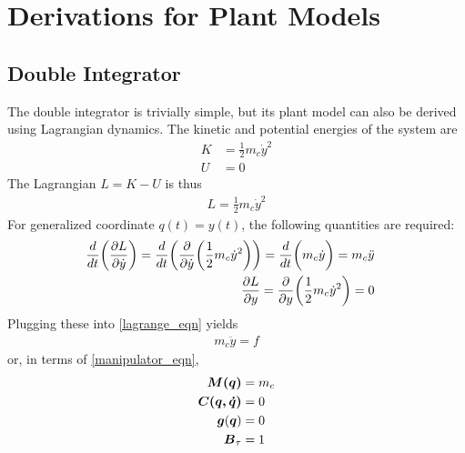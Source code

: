 \chapter{Derivations for Plant Models}
\label{appendix:modeling}
\section{Double Integrator}
\label{appendix:modeling:doubleintegrator}
The double integrator is trivially simple, but its plant model can also be derived using Lagrangian dynamics.  The kinetic and potential energies of the system are
\begin{subequations}
\begin{align}
	K &= \frac{1}{2}m_{c}\dot{y}^{2}\\
	U &= 0
\end{align}
\end{subequations}
The Lagrangian $L = K - U$ is thus
\begin{equation}
\begin{aligned}
	L = \frac{1}{2}m_{c}\dot{y}^{2}
\end{aligned}
\end{equation}
For generalized coordinate $q(t) = y(t)$, the following quantities are required:
\begin{subequations}
\begin{align}
\begin{split}
	\frac{d}{dt} \bigg{(} \frac{\partial L}{\partial \dot{y}} \bigg{)}
	&= \frac{d}{dt} \bigg{(} \frac{\partial}{\partial \dot{y}} \bigg{(} \frac{1}{2}m_{c}\dot{y}^{2} \bigg{)} \bigg{)}
	= \frac{d}{dt} \bigg{(} m_{c} \dot{y} \bigg{)} = m_{c} \ddot{y}
\end{split}
	\\
\begin{split}
	\frac{\partial L}{\partial y}
	&= \frac{\partial}{\partial y} \bigg{(}
	\frac{1}{2}m_{c}\dot{y}^{2}
	\bigg{)} = 0
\end{split}
\end{align}
\end{subequations}
Plugging these into \eqref{lagrange_eqn} yields
\begin{equation}
\begin{aligned}
	m_{c}\ddot{y} = f
\end{aligned}
\end{equation}
or, in terms of \eqref{manipulator_eqn},
\begin{subequations}
\begin{align}
	\vb*{M(q)} &= m_{c}\\
	\vb*{C(q, \dot{q})} &= 0\\
	\vb*{g}(\vb*{q}) &= 0\\
	\vb*{B}_{\tau} &= 1
\end{align}
\end{subequations}

